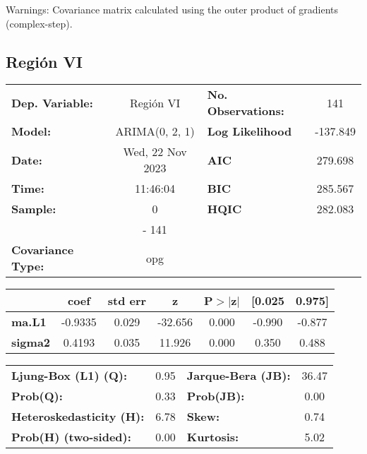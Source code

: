 \documentclass{article}%
\begin{document}
Warnings: \newline
 [1] Covariance matrix calculated using the outer product of gradients (complex-step).%
\subsection*{Región VI}%
\begin{center}
\begin{tabular}{lclc}
\toprule
\textbf{Dep. Variable:}          &    Región VI     & \textbf{  No. Observations:  } &    141      \\
\textbf{Model:}                  &  ARIMA(0, 2, 1)  & \textbf{  Log Likelihood     } &  -137.849   \\
\textbf{Date:}                   & Wed, 22 Nov 2023 & \textbf{  AIC                } &  279.698    \\
\textbf{Time:}                   &     11:46:04     & \textbf{  BIC                } &  285.567    \\
\textbf{Sample:}                 &        0         & \textbf{  HQIC               } &  282.083    \\
\textbf{}                        &       - 141      & \textbf{                     } &             \\
\textbf{Covariance Type:}        &       opg        & \textbf{                     } &             \\
\bottomrule
\end{tabular}
\begin{tabular}{lcccccc}
                & \textbf{coef} & \textbf{std err} & \textbf{z} & \textbf{P$> |$z$|$} & \textbf{[0.025} & \textbf{0.975]}  \\
\midrule
\textbf{ma.L1}  &      -0.9335  &        0.029     &   -32.656  &         0.000        &       -0.990    &       -0.877     \\
\textbf{sigma2} &       0.4193  &        0.035     &    11.926  &         0.000        &        0.350    &        0.488     \\
\bottomrule
\end{tabular}
\begin{tabular}{lclc}
\textbf{Ljung-Box (L1) (Q):}     & 0.95 & \textbf{  Jarque-Bera (JB):  } & 36.47  \\
\textbf{Prob(Q):}                & 0.33 & \textbf{  Prob(JB):          } &  0.00  \\
\textbf{Heteroskedasticity (H):} & 6.78 & \textbf{  Skew:              } &  0.74  \\
\textbf{Prob(H) (two-sided):}    & 0.00 & \textbf{  Kurtosis:          } &  5.02  \\
\bottomrule
\end{tabular}
\end{center}
\end{document}
